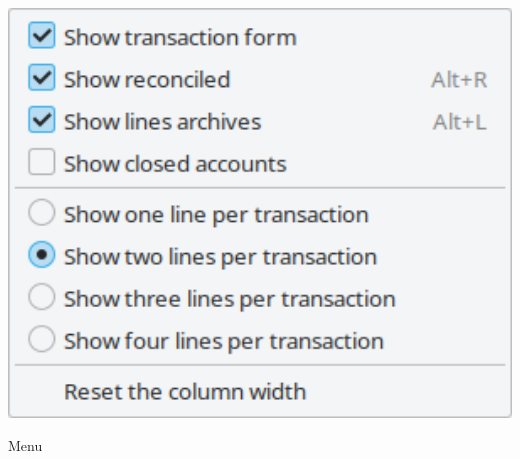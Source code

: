 \begin{minipage}{.3\linewidth}
	\centering						%
	\includegraphics[width=1\textwidth]{image/screenshot/home_menubar_view}
	\vspace{-20pt}					%
	\captionsetup{
		type=figure,%
		name=Fig.,%
		labelsep=newline}			%
	\caption{ Menu}		%
	\label{home_menubar_view}
\end{minipage} %
